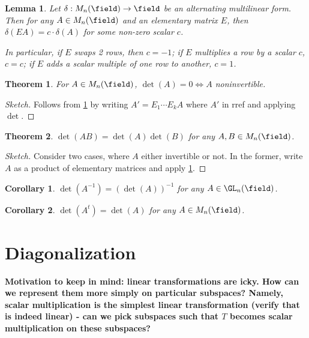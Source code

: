 \documentclass[12pt, oneside]{article}
\theoremstyle{definition}
\theoremstyle{plain}
\newtheorem{thm}{Theorem}
\newtheorem{cor}{Corollary}
\newtheorem{lemma}{Lemma}
\theoremstyle{remark}
\let\origsection=\section
\renewcommand\section[1]{\origsection{#1}\label{sec:\thesection}}
\begin{document}
\begin{lemma}\label{lemma:detonelementary}
  Let $\delta : M_n(\field) \to \field$ be an alternating multilinear form. Then for any $A \in M_n(\field)$ and an elementary matrix $E$, then $\delta(EA) = c \cdot \delta(A)$ for some non-zero scalar $c$.

  In particular, if $E$ swaps 2 rows, then $c = -1$; if $E$ multiplies a row by a scalar $c$, $c = c$; if $E$ adds a scalar multiple of one row to another, $c = 1$.
\end{lemma}

\begin{thm}
  For $A \in M_n(\field)$, $\det(A) = 0 \iff A$ noninvertible.
\end{thm}

\begin{proof}[Sketch]
  Follows from \cref{lemma:detonelementary} by writing $A' = E_1 \cdots E_k A$ where $A'$ in rref and applying $\det$.
\end{proof}

\begin{thm}
  $\det(AB) = \det(A)\det(B)$ for any $A, B \in M_n(\field)$.
\end{thm}

\begin{proof}[Sketch]
  Consider two cases, where $A$ either invertible or not. In the former, write $A$ as a product of elementary matrices and apply \cref{lemma:detonelementary}.
\end{proof}
\begin{cor}
  $\det(A^{-1}) = (\det(A))^{-1}$ for any $A \in \GL_n(\field)$.
\end{cor}

\begin{cor}
  $\det(A^t) = \det(A)$ for any $A \in M_n(\field)$.
\end{cor}

\section{Diagonalization}
\begin{center}
\textbf{Motivation to keep in mind: linear transformations are icky. How can we represent them more simply on particular subspaces? Namely, scalar multiplication is the simplest linear transformation (verify that is indeed linear) - can we pick subspaces such that $T$ becomes scalar multiplication on these subspaces?}
\end{center}
\end{document}
